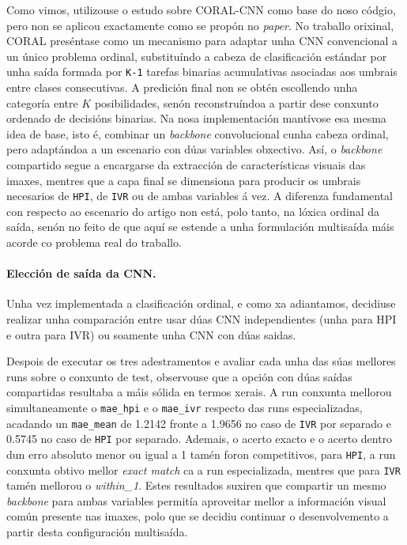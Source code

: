 Como vimos, utilizouse o estudo sobre CORAL-CNN \cite{articuloCoral} como base do noso códgio,
pero non se aplicou exactamente como se propón no \textit{paper}. No traballo orixinal, CORAL
preséntase como un mecanismo para adaptar unha CNN convencional a un único problema ordinal,
substituíndo a cabeza de clasificación estándar por unha saída formada por \texttt{K-1} tarefas binarias
acumulativas asociadas aos umbrais entre clases consecutivas. A predición final non se obtén
escollendo unha categoría entre $K$ posibilidades, senón reconstruíndoa a partir dese
conxunto ordenado de decisións binarias. Na nosa implementación mantívose esa mesma idea de base,
isto é, combinar un \textit{backbone} convolucional cunha cabeza ordinal, pero adaptándoa a un
escenario con dúas variables obxectivo. Así, o \textit{backbone} compartido segue a encargarse da
extracción de características visuais das imaxes, mentres que a capa final se dimensiona para
producir os umbrais necesarios de \texttt{HPI}, de \texttt{IVR} ou de ambas variables á vez. A
diferenza fundamental con respecto ao escenario do artigo non está, polo tanto, na lóxica ordinal da
saída, senón no feito de que aquí se estende a unha formulación multisaída máis acorde co problema
real do traballo.

\paragraph{Elección de saída da CNN.}
Unha vez implementada a clasificación ordinal, e como xa adiantamos, decidiuse realizar unha comparación
entre usar dúas CNN independientes (unha para HPI e outra para IVR) ou soamente unha CNN con dúas saidas.

Despois de executar os tres adestramentos e avaliar cada unha das súas mellores runs sobre o
conxunto de test, observouse que a opción con dúas saídas compartidas resultaba a máis sólida en
termos xerais. A run conxunta mellorou simultaneamente o \texttt{mae\_hpi} e o \texttt{mae\_ivr}
respecto das runs especializadas, acadando un \texttt{mae\_mean} de 1.2142 fronte a 1.9656 no caso
de \texttt{IVR} por separado e 0.5745 no caso de \texttt{HPI} por separado. Ademais, o acerto
exacto e o acerto dentro dun erro absoluto menor ou igual a 1 tamén foron
competitivos, para \texttt{HPI}, a run conxunta obtivo mellor \textit{exact match} ca a run
especializada, mentres que para \texttt{IVR} tamén mellorou o
\textit{within\_1}. Estes resultados suxiren que compartir un mesmo \textit{backbone} para ambas
variables permitía aproveitar mellor a información
visual común presente nas imaxes, polo que se decidiu continuar o desenvolvemento a partir desta
configuración multisaída.

